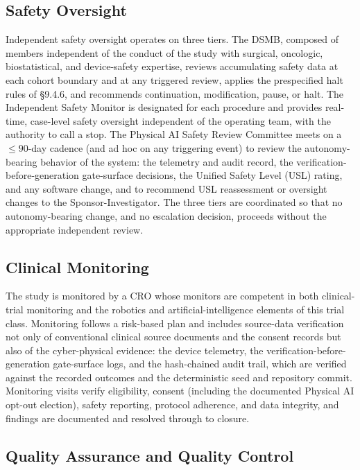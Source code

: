 \subsection{Safety Oversight}

Independent safety oversight operates on three tiers. The DSMB, composed of
members independent of the conduct of the study with surgical, oncologic,
biostatistical, and device-safety expertise, reviews accumulating safety data at
each cohort boundary and at any triggered review, applies the prespecified halt
rules of \S9.4.6, and recommends continuation, modification, pause, or halt. The
Independent Safety Monitor is designated for each procedure and provides
real-time, case-level safety oversight independent of the operating team, with the
authority to call a stop. The Physical AI Safety Review Committee meets on a
$\leq 90$-day cadence (and ad hoc on any triggering event) to review the
autonomy-bearing behavior of the system: the telemetry and audit record, the
verification-before-generation gate-surface decisions, the Unified Safety Level
(USL) rating, and any software change, and to recommend USL reassessment or
oversight changes to the Sponsor-Investigator. The three tiers are coordinated so
that no autonomy-bearing change, and no escalation decision, proceeds without the
appropriate independent review.

\subsection{Clinical Monitoring}

The study is monitored by a CRO whose monitors are competent in both clinical-trial
monitoring and the robotics and artificial-intelligence elements of this trial
class. Monitoring follows a risk-based plan and includes source-data verification
not only of conventional clinical source documents and the consent records but
also of the cyber-physical evidence: the device telemetry, the
verification-before-generation gate-surface logs, and the hash-chained audit trail,
which are verified against the recorded outcomes and the deterministic seed and
repository commit. Monitoring visits verify eligibility, consent (including the
documented Physical AI opt-out election), safety reporting, protocol adherence,
and data integrity, and findings are documented and resolved through to closure.

\subsection{Quality Assurance and Quality Control}

